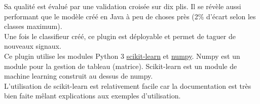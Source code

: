         Sa qualité est évalué par une validation croisée sur dix plis. Il se révèle aussi performant que le modèle créé en Java à peu de choses près (2\% d'écart selon les classes maximum).\\

        Une fois le classifieur créé, ce plugin est déployable et permet de taguer de nouveaux signaux.\\

        Ce plugin utilise les modules Python 3 \href{http://scikit-learn.org/stable/}{scikit-learn} et \href{http://www.numpy.org/}{numpy}. Numpy est un module pour la gestion de tableau (matrice). Scikit-learn est un module de machine learning construit au dessus de numpy.\\
        L'utilisation de scikit-learn est relativement facile car la documentation est très bien faite mêlant explications aux exemples d'utilisation.